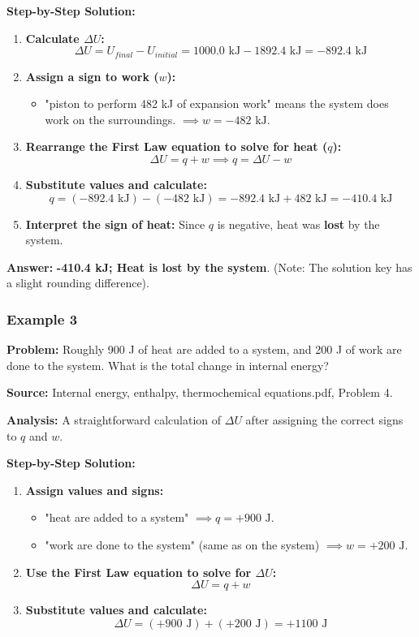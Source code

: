 \documentclass{article}
\begin{document}
\textbf{Step-by-Step Solution:}
\begin{enumerate}
    \item \textbf{Calculate $\Delta U$:}
    \[ \Delta U = U_{final} - U_{initial} = 1000.0 \text{ kJ} - 1892.4 \text{ kJ} = -892.4 \text{ kJ} \]
    \item \textbf{Assign a sign to work ($w$):}
    \begin{itemize}
        \item "piston to perform 482 kJ of expansion work" means the system does work on the surroundings. $\implies w = -482 \text{ kJ}$.
    \end{itemize}
    \item \textbf{Rearrange the First Law equation to solve for heat ($q$):}
    \[ \Delta U = q + w \implies q = \Delta U - w \]
    \item \textbf{Substitute values and calculate:}
    \[ q = (-892.4 \text{ kJ}) - (-482 \text{ kJ}) = -892.4 \text{ kJ} + 482 \text{ kJ} = -410.4 \text{ kJ} \]
    \item \textbf{Interpret the sign of heat:} Since $q$ is negative, heat was \textbf{lost} by the system.
\end{enumerate}

\textbf{Answer:} \textbf{-410.4 kJ; Heat is lost by the system}. (Note: The solution key has a slight rounding difference).

\subsubsection{Example 3}
\textbf{Problem:} Roughly 900 J of heat are added to a system, and 200 J of work are done to the system. What is the total change in internal energy?

\textbf{Source:} Internal energy, enthalpy, thermochemical equations.pdf, Problem 4.

\textbf{Analysis:} A straightforward calculation of $\Delta U$ after assigning the correct signs to $q$ and $w$.

\textbf{Step-by-Step Solution:}
\begin{enumerate}
    \item \textbf{Assign values and signs:}
    \begin{itemize}
        \item "heat are added to a system" $\implies q = +900 \text{ J}$.
        \item "work are done to the system" (same as on the system) $\implies w = +200 \text{ J}$.
    \end{itemize}
    \item \textbf{Use the First Law equation to solve for $\Delta U$:}
    \[ \Delta U = q + w \]
    \item \textbf{Substitute values and calculate:}
    \[ \Delta U = (+900 \text{ J}) + (+200 \text{ J}) = +1100 \text{ J} \]
\end{enumerate}
\end{document}
